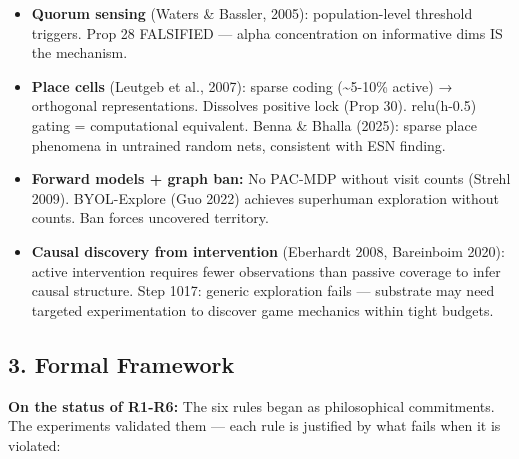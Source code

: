 \documentclass[
  11pt,
]{article}
\providecommand{\tightlist}{%
  \setlength{\itemsep}{0pt}\setlength{\parskip}{0pt}}
\begin{document}
\begin{itemize}
\tightlist
\item
  \textbf{Quorum sensing} (Waters \& Bassler, 2005): population-level
  threshold triggers. Prop 28 FALSIFIED --- alpha concentration on
  informative dims IS the mechanism.
\item
  \textbf{Place cells} (Leutgeb et al., 2007): sparse coding
  (\textasciitilde5-10\% active) → orthogonal representations. Dissolves
  positive lock (Prop 30). relu(h-0.5) gating = computational
  equivalent. Benna \& Bhalla (2025): sparse place phenomena in
  untrained random nets, consistent with ESN finding.
\item
  \textbf{Forward models + graph ban:} No PAC-MDP without visit counts
  (Strehl 2009). BYOL-Explore (Guo 2022) achieves superhuman exploration
  without counts. Ban forces uncovered territory.
\item
  \textbf{Causal discovery from intervention} (Eberhardt 2008,
  Bareinboim 2020): active intervention requires fewer observations than
  passive coverage to infer causal structure. Step 1017: generic
  exploration fails --- substrate may need targeted experimentation to
  discover game mechanics within tight budgets.
\end{itemize}

\subsection{3. Formal Framework}\label{formal-framework}

\textbf{On the status of R1-R6:} The six rules began as philosophical
commitments. The experiments validated them --- each rule is justified
by what fails when it is violated:
\end{document}
